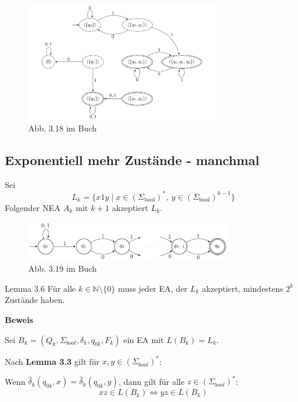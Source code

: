 \documentclass[a4paper, 11pt]{article}
\def\N{\mathbb{N}}
\begin{document}
        \begin{figure}[htp]
            \centering
            \includegraphics[width=0.75\textwidth]{Potenzmengenkonstruktion_Beispiel.png}
            \caption{Abb. 3.18 im Buch}
        \end{figure}
    
    
    
        \subsection{Exponentiell mehr Zustände - manchmal}
        Sei 
        $$L_k = \{x1y \mid x \in (\Sigma_{\text{bool}})^*, \ y \in (\Sigma_{\text{bool}})^{k-1}\}$$
        Folgender NEA $A_k$ mit $k+1$ akzeptiert $L_k$.
        \begin{figure}
            \includegraphics[width=0.8\textwidth]{NEA_A_k.png}
            \caption{Abb. 3.19 im Buch}
        \end{figure}
    
        \begin{mainbox}{Lemma 3.6}
            Für alle $k \in \N \setminus \{0\}$ muss jeder EA, der $L_k$ akzeptiert, mindestens $2^k$ Zustände haben.
        \end{mainbox}
        \textbf{Beweis}
    
        Sei $B_k = (Q_k, \Sigma_{bool}, \delta_k, q_{0k}, F_k)$ ein EA mit $L(B_k) = L_k$. 
        
        Nach \textbf{Lemma 3.3} gilt für $x,y \in (\Sigma_{bool})^*$:
    
        Wenn $\hat{\delta}_k (q_{0k}, x) = \hat{\delta}_k (q_{0k}, y)$, dann gilt für alle $z \in (\Sigma_{bool})^*$:
        $$xz \in L(B_k) \iff yz \in L(B_k)$$
    
\end{document}
